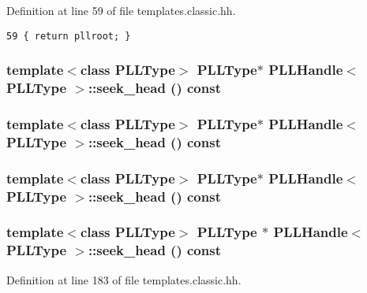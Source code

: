 Definition at line 59 of file templates.classic.hh.



\footnotesize\begin{verbatim}59 { return pllroot; } 
\end{verbatim}\normalsize 
{}
\subsubsection{\setlength{\rightskip}{0pt plus 5cm}template$<$class PLLType$>$ {\bf PLLType}$\ast$ PLLHandle$<$ {\bf PLLType} $>$::seek\_\-head () const\hspace{0.3cm}{\tt  [inline]}}\label{classPLLHandle_a45}


\subsubsection{\setlength{\rightskip}{0pt plus 5cm}template$<$class PLLType$>$ {\bf PLLType}$\ast$ PLLHandle$<$ {\bf PLLType} $>$::seek\_\-head () const\hspace{0.3cm}{\tt  [inline]}}\label{classPLLHandle_a32}


\subsubsection{\setlength{\rightskip}{0pt plus 5cm}template$<$class PLLType$>$ {\bf PLLType}$\ast$ PLLHandle$<$ {\bf PLLType} $>$::seek\_\-head () const\hspace{0.3cm}{\tt  [inline]}}\label{classPLLHandle_a19}


\subsubsection{\setlength{\rightskip}{0pt plus 5cm}template$<$class PLLType$>$ {\bf PLLType} $\ast$ PLLHandle$<$ {\bf PLLType} $>$::seek\_\-head () const\hspace{0.3cm}{\tt  [inline]}}\label{classPLLHandle_a6}




Definition at line 183 of file templates.classic.hh.

